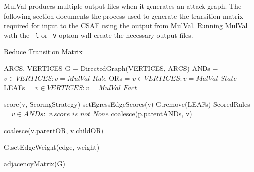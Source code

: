 
MulVal produces multiple output files when it generates an attack graph. The following section documents the process used to generate the transition matrix required for input to the CSAF using the output from MulVal. Running MulVal with the \verb|-l| or \verb|-v| option will create the necessary output files.







\begin{algorithm}
\caption{Reduce Transition Matrix}
\label{genTransMatrix}

\begin{algorithmic}
\REQUIRE ARCS, VERTICES
\STATE G = DirectedGraph(VERTICES, ARCS)
\STATE ANDs = $v \in VERTICES : v = \textit{MulVal Rule}$
\STATE ORs = $v \in VERTICES : v = \textit{MulVal State}$
\STATE LEAFs = $v \in VERTICES : v = \textit{MulVal Fact}$

 \STATE score(v, ScoringStrategy)
 \STATE setEgressEdgeScores(v)
\ENDFOR
\STATE G.remove(LEAFs) 
\STATE ScoredRules = $v \in ANDs : \textit{ v.score is not None}$
    \STATE coalesce(p.parentANDs, v)
\ENDFOR
\ENDWHILE

 \STATE coalesce(v.parentOR, v.childOR)
\ENDFOR

 \STATE G.setEdgeWeight(edge, weight)
\ENDFOR

 \RETURN adjacencyMatrix(G)
 \end{algorithmic}
\end{algorithm}


